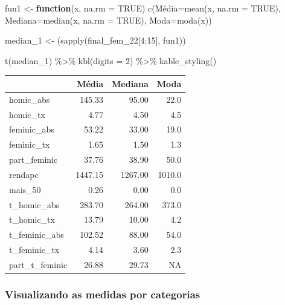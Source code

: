 \documentclass[
  letterpaper,
  DIV=11,
  numbers=noendperiod]{scrreprt}
\newenvironment{Shaded}{\begin{snugshade}}{\end{snugshade}}
\newcommand{\AttributeTok}[1]{\textcolor[rgb]{0.40,0.45,0.13}{#1}}
\newcommand{\ConstantTok}[1]{\textcolor[rgb]{0.56,0.35,0.01}{#1}}
\newcommand{\ControlFlowTok}[1]{\textcolor[rgb]{0.00,0.23,0.31}{\textbf{#1}}}
\newcommand{\DecValTok}[1]{\textcolor[rgb]{0.68,0.00,0.00}{#1}}
\newcommand{\FunctionTok}[1]{\textcolor[rgb]{0.28,0.35,0.67}{#1}}
\newcommand{\NormalTok}[1]{\textcolor[rgb]{0.00,0.23,0.31}{#1}}
\newcommand{\OtherTok}[1]{\textcolor[rgb]{0.00,0.23,0.31}{#1}}
\newcommand{\SpecialCharTok}[1]{\textcolor[rgb]{0.37,0.37,0.37}{#1}}
\begin{document}
\begin{Shaded}
\begin{Highlighting}[]
\NormalTok{fun1 }\OtherTok{\textless{}{-}} \ControlFlowTok{function}\NormalTok{(x, }\AttributeTok{na.rm =} \ConstantTok{TRUE}\NormalTok{) }\FunctionTok{c}\NormalTok{(Média}\OtherTok{=}\FunctionTok{mean}\NormalTok{(x, }\AttributeTok{na.rm =} \ConstantTok{TRUE}\NormalTok{), }\AttributeTok{Mediana=}\FunctionTok{median}\NormalTok{(x, }\AttributeTok{na.rm =} \ConstantTok{TRUE}\NormalTok{), }\AttributeTok{Moda=}\FunctionTok{moda}\NormalTok{(x))}

\NormalTok{median\_1 }\OtherTok{\textless{}{-}}\NormalTok{ (}\FunctionTok{sapply}\NormalTok{(final\_fem\_22[}\DecValTok{4}\SpecialCharTok{:}\DecValTok{15}\NormalTok{], fun1))}

\FunctionTok{t}\NormalTok{(median\_1) }\SpecialCharTok{\%\textgreater{}\%} 
  \FunctionTok{kbl}\NormalTok{(}\AttributeTok{digits =} \DecValTok{2}\NormalTok{) }\SpecialCharTok{\%\textgreater{}\%}
     \FunctionTok{kable\_styling}\NormalTok{()}
\end{Highlighting}
\end{Shaded}

\begin{table}
\centering
\begin{tabular}[t]{l|r|r|r}
\hline
  & Média & Mediana & Moda\\
\hline
homic\_abs & 145.33 & 95.00 & 22.0\\
\hline
homic\_tx & 4.77 & 4.50 & 4.5\\
\hline
feminic\_abs & 53.22 & 33.00 & 19.0\\
\hline
feminic\_tx & 1.65 & 1.50 & 1.3\\
\hline
part\_feminic & 37.76 & 38.90 & 50.0\\
\hline
rendapc & 1447.15 & 1267.00 & 1010.0\\
\hline
mais\_50 & 0.26 & 0.00 & 0.0\\
\hline
t\_homic\_abs & 283.70 & 264.00 & 373.0\\
\hline
t\_homic\_tx & 13.79 & 10.00 & 4.2\\
\hline
t\_feminic\_abs & 102.52 & 88.00 & 54.0\\
\hline
t\_feminic\_tx & 4.14 & 3.60 & 2.3\\
\hline
part\_t\_feminic & 26.88 & 29.73 & NA\\
\hline
\end{tabular}
\end{table}

\subsubsection{Visualizando as medidas por
categorias}\label{visualizando-as-medidas-por-categorias}
\end{document}
